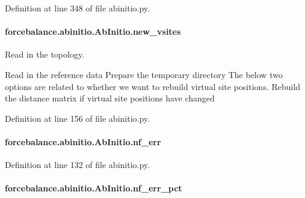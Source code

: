 Definition at line 348 of file abinitio.\-py.

\hypertarget{classforcebalance_1_1abinitio_1_1AbInitio_a64f1aeadac4d7b09424c20b83e5ad5af}{
\paragraph[{new\-\_\-vsites}]{\setlength{\rightskip}{0pt plus 5cm}forcebalance.\-abinitio.\-Ab\-Initio.\-new\-\_\-vsites\hspace{0.3cm}{\ttfamily [inherited]}}}\label{classforcebalance_1_1abinitio_1_1AbInitio_a64f1aeadac4d7b09424c20b83e5ad5af}


Read in the topology. 

Read in the reference data Prepare the temporary directory The below two options are related to whether we want to rebuild virtual site positions. Rebuild the distance matrix if virtual site positions have changed 

Definition at line 156 of file abinitio.\-py.

\hypertarget{classforcebalance_1_1abinitio_1_1AbInitio_a89de620e9aa500481c9e1ded99e14f72}{
\paragraph[{nf\-\_\-err}]{\setlength{\rightskip}{0pt plus 5cm}forcebalance.\-abinitio.\-Ab\-Initio.\-nf\-\_\-err\hspace{0.3cm}{\ttfamily [inherited]}}}\label{classforcebalance_1_1abinitio_1_1AbInitio_a89de620e9aa500481c9e1ded99e14f72}


Definition at line 132 of file abinitio.\-py.

\hypertarget{classforcebalance_1_1abinitio_1_1AbInitio_a184edac2cb27a999c363595ea59d8163}{
\paragraph[{nf\-\_\-err\-\_\-pct}]{\setlength{\rightskip}{0pt plus 5cm}forcebalance.\-abinitio.\-Ab\-Initio.\-nf\-\_\-err\-\_\-pct\hspace{0.3cm}{\ttfamily [inherited]}}}\label{classforcebalance_1_1abinitio_1_1AbInitio_a184edac2cb27a999c363595ea59d8163}


